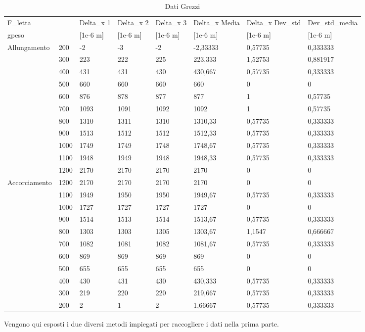 \documentclass[a4paper,11pt,oneside]{article}
\begin{document}
\begin{table}[]
\centering
\begin{tabular}{ll|l|l|l|l|l|l}
\hline
\multicolumn{2}{l}{F\_letta} & Delta\_x 1 & Delta\_x 2 & Delta\_x 3 & Delta\_x Media & Delta\_x Dev\_std & Dev\_std\_media \\
\multicolumn{2}{l}{gpeso} & {[}1e-6 m{]} & {[}1e-6 m{]} & {[}1e-6 m{]} & {[}1e-6 m{]} & {[}1e-6 m{]} & {[}1e-6 m{]} \\ \hline
Allungamento & 200 & -2 & -3 & -2 & -2,33333 & 0,57735 & 0,333333 \\
 & 300 & 223 & 222 & 225 & 223,333 & 1,52753 & 0,881917 \\
 & 400 & 431 & 431 & 430 & 430,667 & 0,57735 & 0,333333 \\
 & 500 & 660 & 660 & 660 & 660 & 0 & 0 \\
 & 600 & 876 & 878 & 877 & 877 & 1 & 0,57735 \\
 & 700 & 1093 & 1091 & 1092 & 1092 & 1 & 0,57735 \\
 & 800 & 1310 & 1311 & 1310 & 1310,33 & 0,57735 & 0,333333 \\
 & 900 & 1513 & 1512 & 1512 & 1512,33 & 0,57735 & 0,333333 \\
 & 1000 & 1749 & 1749 & 1748 & 1748,67 & 0,57735 & 0,333333 \\
 & 1100 & 1948 & 1949 & 1948 & 1948,33 & 0,57735 & 0,333333 \\
 & 1200 & 2170 & 2170 & 2170 & 2170 & 0 & 0 \\ \hline
Accorciamento & 1200 & 2170 & 2170 & 2170 & 2170 & 0 & 0 \\
 & 1100 & 1949 & 1950 & 1950 & 1949,67 & 0,57735 & 0,333333 \\
 & 1000 & 1727 & 1727 & 1727 & 1727 & 0 & 0 \\
 & 900 & 1514 & 1513 & 1514 & 1513,67 & 0,57735 & 0,333333 \\
 & 800 & 1303 & 1303 & 1305 & 1303,67 & 1,1547 & 0,666667 \\
 & 700 & 1082 & 1081 & 1082 & 1081,67 & 0,57735 & 0,333333 \\
 & 600 & 869 & 869 & 869 & 869 & 0 & 0 \\
 & 500 & 655 & 655 & 655 & 655 & 0 & 0 \\
 & 400 & 430 & 431 & 430 & 430,333 & 0,57735 & 0,333333 \\
 & 300 & 219 & 220 & 220 & 219,667 & 0,57735 & 0,333333 \\
 & 200 & 2 & 1 & 2 & 1,66667 & 0,57735 & 0,333333 \\ \hline
\end{tabular}
\caption{Dati Grezzi}
\label{tab:dati_grezzi}
\end{table}
Vengono qui esposti i due diversi metodi impiegati per raccogliere i dati nella prima parte.
\end{document}
